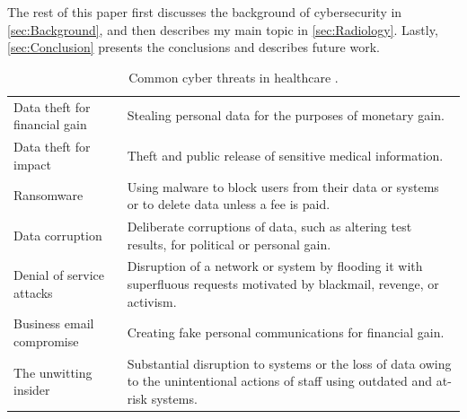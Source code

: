 \documentclass[pdf,bookmarks,colorlinks=true]{IEEEtran}
\begin{document}
The rest of this paper first discusses the background of cybersecurity in
\ref{sec:Background}, and then describes my main topic in
\ref{sec:Radiology}. Lastly, \ref{sec:Conclusion} presents the
conclusions and describes future work.

\begin{table}[tbh]
	\caption{Common cyber threats in healthcare \cite{martin2017cybersecurity}.}
	\centering
	\begin{tabular}{l | l}
		\hline
	Data theft for financial gain & Stealing personal data for the purposes of monetary gain. \\
	Data theft for impact & Theft and public release of sensitive medical information. \\
	Ransomware & Using malware to block users from their data or systems or to delete data unless a fee is paid. \\
	Data corruption & Deliberate corruptions of data, such as altering test results, for political or personal gain. \\
	Denial of service attacks & Disruption of a network or system by flooding it with superfluous requests motivated by blackmail, revenge, or activism. \\
	Business email compromise & Creating fake personal communications for financial gain.\\ 
	The unwitting insider & Substantial disruption to systems or the loss of data owing to the unintentional actions of staff using outdated and at-risk systems. \\
	\hline
	\end{tabular}
	\label{tab:common}
\end{table}
\end{document}
